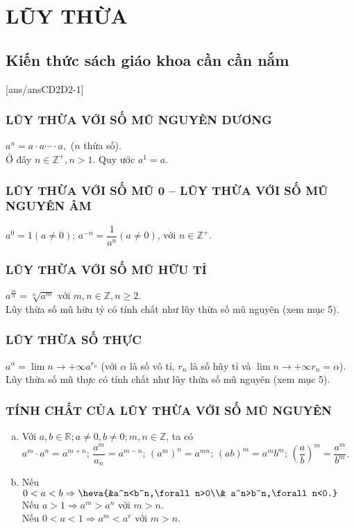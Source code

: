 \setcounter{chapter}{1}%
\section{LŨY THỪA}
\subsection{Kiến thức sách giáo khoa cần cần nắm}
[ans/ansCD2D2-1]
\subsubsection{LŨY THỪA VỚI SỐ MŨ NGUYÊN DƯƠNG}
\hspace*{5cm} $a^n=a\cdot a\cdots\cdot a,$ ($n$ thừa số).\\
Ở đây $n\in\mathbb{Z}^+, n>1$. Quy ước $a^1=a$.
\subsubsection{LŨY THỪA VỚI SỐ MŨ 0 – LŨY THỪA VỚI SỐ MŨ NGUYÊN ÂM}
\hspace*{5cm} $a^{0}=1(a\neq 0)$; $a^{-n}=\dfrac{1}{a^n}(a\neq 0)$, với $n\in\mathbb{Z}^+$.
\subsubsection{LŨY THỪA VỚI SỐ MŨ HỮU TỈ}
\hspace*{5cm} $a^{\tfrac{m}{n}}=\sqrt[n]{a^m} $ với $m,n \in \mathbb{Z}, n \geq 2.$\\
Lũy thừa số mũ hữu tỷ có tính chất như lũy thừa số mũ nguyên (xem mục 5).
\subsubsection{LŨY THỪA SỐ THỰC}
\hspace*{5cm}  $a^{\alpha}=\lim \limits{n \to +\infty}a^{r_n}$ (với $\alpha$ là số vô tỉ, $r_n$ là số hũy tỉ và $\lim \limits{n \to +\infty}r_n=\alpha$).\\
Lũy thừa số mũ thực có tính chất như lũy thừa số mũ nguyên (xem mục 5).
\subsubsection{TÍNH CHẤT CỦA LŨY THỪA VỚI SỐ MŨ NGUYÊN}
\begin{enumerate}[a)]
	\item Với $a,b \in \mathbb{R};a \neq 0,b \neq 0;m,n \in \mathbb{Z} $, ta có\\
	$a^m\cdot a^n=a^{m+n};\,\dfrac{a^m}{a_n}=a^{m-n};\,\left(a^m\right)^n=a^{mn};\,(ab)^m=a^mb^m;\,\left(\dfrac{a}{b}\right)^m=\dfrac{a^m}{b^m} $.
	\item Nếu $0<a<b \Rightarrow \heva{&a^n<b^n,\forall n>0\\& a^n>b^n,\forall n<0.} $\\
	Nếu $a>1\Rightarrow a^m>a^n$ với $m>n$.\\
	Nếu $0<a<1 \Rightarrow a^m<a^{r} $ với  $m>n$.
\end{enumerate}
